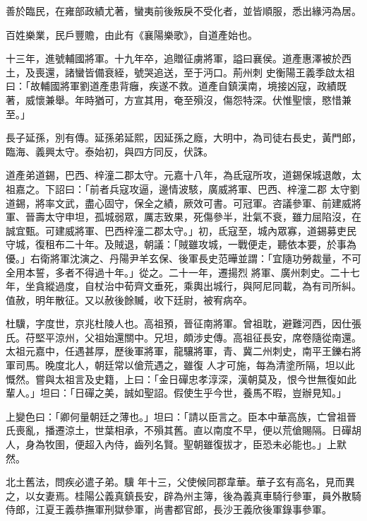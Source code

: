 \begin{pinyinscope}
 善於臨民，在雍部政績尤著，蠻夷前後叛戾不受化者，並皆順服，悉出緣沔為居。



 百姓樂業，民戶豐贍，由此有《襄陽樂歌》，自道產始也。



 十三年，進號輔國將軍。十九年卒，追贈征虜將軍，謚曰襄侯。道產惠澤被於西土，及喪還，諸蠻皆備衰絰，號哭追送，至于沔口。荊州刺
 史衡陽王義季啟太祖曰：「故輔國將軍劉道產患背癰，疾遂不救。道產自鎮漢南，境接凶寇，政績既著，威懷兼舉。年時猶可，方宣其用，奄至殞沒，傷怨特深。伏惟聖懷，愍惜兼至。」



 長子延孫，別有傳。延孫弟延熙，因延孫之廕，大明中，為司徒右長史，黃門郎，臨海、義興太守。泰始初，與四方同反，伏誅。



 道產弟道錫，巴西、梓潼二郡太守。元嘉十八年，為氐寇所攻，道錫保城退敵，太祖嘉之。下詔曰：「前者兵寇攻逼，邊情波駭，廣威將軍、巴西、梓潼二郡
 太守劉道錫，將率文武，盡心固守，保全之績，厥效可書。可冠軍。咨議參軍、前建威將軍、晉壽太守申坦，孤城弱眾，厲志致果，死傷參半，壯氣不衰，雖力屈陷沒，在誠宜甄。可建威將軍、巴西梓潼二郡太守。」初，氐寇至，城內眾寡，道錫募吏民守城，復租布二十年。及賊退，朝議：「賊雖攻城，一戰便走，聽依本要，於事為優。」右衛將軍沈演之、丹陽尹羊玄保、後軍長史范曄並謂：「宜隨功勞裁量，不可全用本誓，多者不得過十年。」從之。二十一年，遷揚烈
 將軍、廣州刺史。二十七年，坐貪縱過度，自杖治中荀齊文垂死，乘輿出城行，與阿尼同載，為有司所糾。值赦，明年散征。又以赦後餘贓，收下廷尉，被宥病卒。



 杜驥，字度世，京兆杜陵人也。高祖預，晉征南將軍。曾祖耽，避難河西，因仕張氏。苻堅平涼州，父祖始還關中。兄坦，頗涉史傳。高祖征長安，席卷隨從南還。太祖元嘉中，任遇甚厚，歷後軍將軍，龍驤將軍，青、冀二州刺史，南平王鑠右將軍司馬。晚度北人，朝廷常以傖荒遇之，雖復
 人才可施，每為清塗所隔，坦以此慨然。嘗與太祖言及史籍，上曰：「金日磾忠孝淳深，漢朝莫及，恨今世無復如此輩人。」坦曰：「日磾之美，誠如聖詔。假使生乎今世，養馬不暇，豈辦見知。」



 上變色曰：「卿何量朝廷之薄也。」坦曰：「請以臣言之。臣本中華高族，亡曾祖晉氏喪亂，播遷涼土，世葉相承，不殞其舊。直以南度不早，便以荒傖賜隔。日磾胡人，身為牧圉，便超入內侍，齒列名賢。聖朝雖復拔才，臣恐未必能也。」上默然。



 北土舊法，問疾必遣子弟。驥
 年十三，父使候同郡韋華。華子玄有高名，見而異之，以女妻焉。桂陽公義真鎮長安，辟為州主簿，後為義真車騎行參軍，員外散騎侍郎，江夏王義恭撫軍刑獄參軍，尚書都官郎，長沙王義欣後軍錄事參軍。




\end{pinyinscope}
